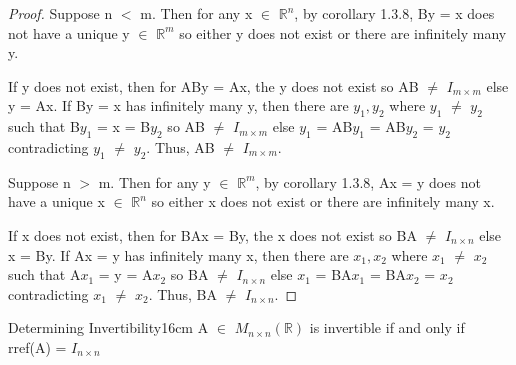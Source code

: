     \begin{proof}
        Suppose n $<$ m.
        Then for any x $\in$ $\mathbb{R}^n$,
        by {\color{orange} corollary 1.3.8}, By = x
        does not have a unique y $\in$ $\mathbb{R}^m$
        so either y does not exist or there are infinitely many y.

        If y does not exist, then for ABy = Ax, the y does not exist
        so AB $\not =$ $I_{m \times m}$ else y = Ax.
        If By = x has infinitely many y,
        then there are $y_1,y_2$ where $y_1$ $\not =$ $y_2$
        such that B$y_1$ = x = B$y_2$ so AB $\not =$ $I_{m \times m}$ else
        $y_1$ = AB$y_1$ = AB$y_2$ = $y_2$
        contradicting $y_1$ $\not =$ $y_2$.
        Thus, AB $\not =$ $I_{m \times m}$.

        \vspace{0.2cm}

        Suppose n $>$ m.
        Then for any y $\in$ $\mathbb{R}^m$,
        by {\color{orange} corollary 1.3.8}, Ax = y
        does not have a unique x $\in$ $\mathbb{R}^n$
        so either x does not exist or there are infinitely many x.
        
        If x does not exist, then for BAx = By, the x does not exist
        so BA $\not =$ $I_{n \times n}$ else x = By.
        If Ax = y has infinitely many x,
        then there are $x_1,x_2$ where $x_1$ $\not =$ $x_2$
        such that A$x_1$ = y = A$x_2$ so BA $\not =$ $I_{n \times n}$ else
        $x_1$ = BA$x_1$ = BA$x_2$ = $x_2$
        contradicting $x_1$ $\not =$ $x_2$.
        Thus, BA $\not =$ $I_{n \times n}$.
    \end{proof}

    \vspace{0.5cm}



    \begin{wtheorem}{Determining Invertibility}{16cm}
        A $\in$ $M_{n \times n}(\mathbb{R})$ is invertible if and only if
        rref(A) = $I_{n \times n}$
    \end{wtheorem}

